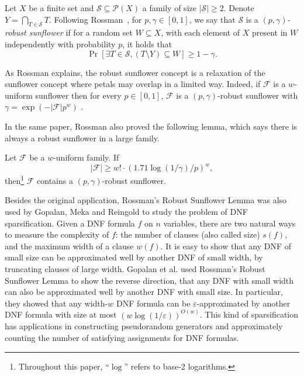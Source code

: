 \documentclass{toc}
\newcommand{\eps}{\varepsilon}
\newcommand{\calF}{\mathcal{F}} %
\begin{document}
%

\begin{definition}
\label{def:qsflower}
Let $X$ be a finite set
and  %
$\mathcal{S}\subseteq\mathcal{P}(X)$
%
a family %
%
of size  %
$|\mathcal{S}|\geq 2$.
Denote $Y=\underset{T\in\mathcal{S}}\bigcap T$.
%
%
Following Rossman~\cite{rossman2010monotone}, for %
%
$p, \gamma \in [0, 1]$,
%
we say that $\mathcal{S}$ is   %
a \emph{$(p,\gamma)$-robust sunflower} %
if for a random set $W\subseteq X$,
with each element of $X$ present in $W$ independently with probability $p$,
it holds that
\[
\Pr\left[\exists T \in \mathcal{S}, (T \setminus Y ) \subseteq W \right] \geq 1 -\gamma. \]
\end{definition}
%
%
As Rossman explains, the robust sunflower concept is a relaxation
of the sunflower concept where petals may overlap in a limited way.
Indeed, if $\calF$ is a $w$-uniform sunflower then for every $p\in [0,1]$,
$\calF$ is a $(p,\gamma)$-robust sunflower with $\gamma =\exp(-|\calF| p^w)$
\cite[Remark 13]{rossman2010monotone}.  %

In the same paper, Rossman also proved the following
%
%
%
lemma,
which says there is always a robust sunflower in a large family.
%

\begin{lemma}
%
Let $\calF$ be a $w$-uniform family.  
If %
\[|\calF|\geq w!\cdot(1.71\log(1/\gamma)/p)^{w},\]
then\footnote{Throughout this paper, ``$\log$'' refers to
base-2 logarithms.}  %
$\calF$ contains a $(p, \gamma)$-robust sunflower.
\end{lemma}
%
%
%

Besides the original application, Rossman's Robust Sunflower Lemma 
was also used by Gopalan, Meka and Reingold \cite{gopalan2013dnf} 
to study the
problem of DNF sparsification. Given a DNF formula $f$ on $n$ variables, there are two natural ways to measure the complexity of $f$: the number of
clauses (also called size) $s(f)$, and the maximum width of a  clause $w(f)$. It is easy to show that any DNF of small size can be approximated well
by another DNF of small width, by truncating clauses of large width. Gopalan {et al.} \cite{gopalan2013dnf} used Rossman's Robust Sunflower Lemma to
show the reverse direction, that any DNF with small width can also be approximated well by another DNF with small size. In particular, they showed
that  any width-$w$ DNF formula can be $\eps$-approximated by another DNF formula with size at most $(w\log(1/\eps))^{O(w)}$. This kind of
sparsification has applications in constructing pseudorandom generators and approximately counting the number of satisfying assignments for DNF
formulas.
\end{document}
